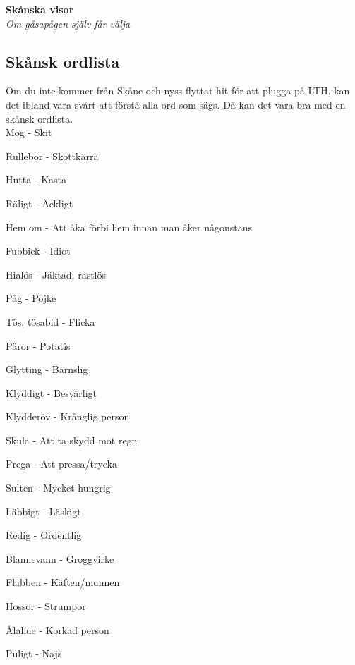 \begin{center}
    \vspace*{1.5cm}
    {\fontsize{20}{20}\textbf{Skånska visor}}\\
    \vspace{0.7cm}
    {\fontsize{12}{12}\textit{Om gåsapågen själv får välja}}
\end{center}
\noBackground

\newpage
\resetBackground



\subsection*{Skånsk ordlista}

Om du inte kommer från Skåne och nyss flyttat hit för att plugga på LTH, 
kan det ibland vara svårt att förstå alla ord som sägs. Då kan det vara bra
med en skånsk ordlista. \\



Mög - Skit

Rullebör - Skottkärra

Hutta - Kasta

Räligt - Äckligt

Hem om - Att åka förbi hem innan man åker någonstans

Fubbick - Idiot

Hialös - Jäktad, rastlös

Påg - Pojke

Tös, tösabid - Flicka

Päror - Potatis

Glytting - Barnslig

Klyddigt - Besvärligt

Klydderöv - Krånglig person

Skula - Att ta skydd mot regn

Prega - Att pressa/trycka

Sulten - Mycket hungrig

Läbbigt - Läskigt

Redig - Ordentlig

Blannevann - Groggvirke

Flabben - Käften/munnen

Hossor - Strumpor

Ålahue - Korkad person

Puligt - Najs

